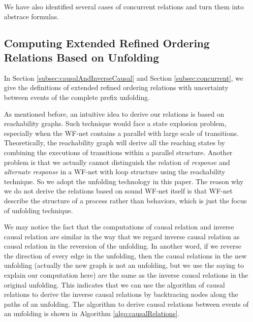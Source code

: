 \documentclass{llncs}
\begin{document}
\begin{definition}\label{def:neverConcurrent}
\end{definition}

\begin{definition}\label{def:sometimesConcurrent}
\end{definition}

We have also identified several cases of concurrent relations and turn them into abstrace formulas.

\subsection{Computing Extended Refined Ordering Relations Based on Unfolding}\label{subsec:computationOfRelations}
In Section \ref{subsec:causalAndInverseCausal} and Section \ref{subsec:concurrent}, we give the definitions of extended refined ordering relations with uncertainty between events of the complete prefix unfolding. 

As mentioned before, an intuitive idea to derive our relations is based on reachability graphs. Such technique would face a state explosion problem, especially when the WF-net contains a parallel with large scale of transitions. Theoretically, the reachability graph will derive all the reaching states by combining the executions of transitions within a parallel structure. Another problem is that we actually cannot distinguish the relation of \textit{response} and \textit{alternate response} in a WF-net with loop structure using the reachability technique. So we adopt the unfolding technology in this paper. The reason why we do not derive the relations based on sound WF-net itself is that WF-net describe the structure of a process rather than behaviors, which is just the focus of unfolding technique.

We may notice the fact that the computations of causal relation and inverse causal relation are similar in the way that we regard inverse causal relation as causal relation in the reversion of the unfolding. In another word, if we reverse the direction of every edge in the unfolding, then the causal relations in the new unfolding (actually the new graph is not an unfolding, but we use the saying to explain our computation here) are the same as the inverse causal relations in the original unfolding. This indicates that we can use the algorithm of causal relations to derive the inverse causal relations by backtracing nodes along the paths of an unfolding. The algorithm to derive causal relations between events of an unfolding is shown in Algorithm \ref{algo:causalRelations}. 
\end{document}
